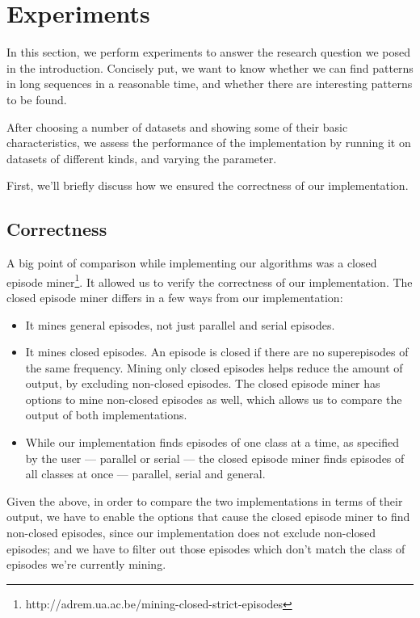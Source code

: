 \chapter{Experiments}
\label{sec:experiments}

In this section, we perform experiments to answer the research question we posed in the introduction. Concisely put, we want to know whether we can find patterns in long sequences in a reasonable time, and whether there are interesting patterns to be found.

After choosing a number of datasets and showing some of their basic characteristics, we assess the performance of the implementation by running it on datasets of different kinds, and varying the parameter.

First, we'll briefly discuss how we ensured the correctness of our implementation.

\section{Correctness}
\label{sec:experiments-correctness}

A big point of comparison while implementing our algorithms was a closed episode miner\footnote{http://adrem.ua.ac.be/mining-closed-strict-episodes}. It allowed us to verify the correctness of our implementation. The closed episode miner differs in a few ways from our implementation:

\begin{itemize}
\item It mines general episodes, not just parallel and serial episodes.
\item It mines closed episodes. An episode is closed if there are no superepisodes of the same frequency. Mining only closed episodes helps reduce the amount of output, by excluding non-closed episodes. The closed episode miner has options to mine non-closed episodes as well, which allows us to compare the output of both implementations.
\item While our implementation finds episodes of one class at a time, as specified by the user --- parallel or serial --- the closed episode miner finds episodes of all classes at once --- parallel, serial and general.
\end{itemize}

Given the above, in order to compare the two implementations in terms of their output, we have to enable the options that cause the closed episode miner to find non-closed episodes, since our implementation does not exclude non-closed episodes; and we have to filter out those episodes which don't match the class of episodes we're currently mining.


